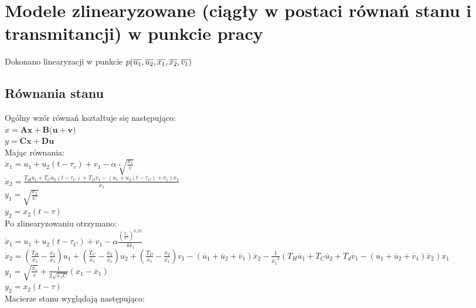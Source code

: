\section{Modele zlinearyzowane (ciągły w postaci równań stanu i transmitancji) w punkcie pracy}

Dokonano linearyzacji w punkcie $p(\overline{u_1}, \overline{u_2}, \overline{x_1}, \overline{x_2}, \overline{v_1})\\$





\subsection{Równania stanu}
Ogólny wzór równań kształtuje się następująco:\\
\(\dot{x}=\textbf{A}\textbf{x}+\textbf{B}(\textbf{u}+\textbf{v)}\)\\
\(\dot{y}=\textbf{C}\textbf{x}+\textbf{D}\textbf{u}\)\\
\newline Mając równania:\\
\(\dot{x}_1=u_1+u_2(t-\tau_c)+v_1-\alpha \sqrt[4]{\frac{x_1}{c}}\)\\
\(\dot{x}_2=\frac{T_H u_1+T_C u_2(t-\tau_C)+T_D v_1-(u_1+u_2(t-\tau_C)+v_1)x_2}{x_1}\)\\
\(y_1=\sqrt{\frac{x_1}{C}}\)\\
\(y_2=x_2(t-\tau)\)\\
\newline Po zlinearyzowaniu otrzymano:\\
 \(\dot{x}_1=u_1+u_2(t-\tau_C)+v_1-\alpha \frac{(\frac{\overline{x}_1}{C})^{0,25}}{4\overline{x}_1}\)\\
\(\dot{x}_2=(\frac{T_H}{\overline{x}_1}-\frac{\overline{x}_2}{\overline{x}_1})u_1+(\frac{T_C}{\overline{x}_1}-\frac{\overline{x}_2}{\overline{x}_1})u_2+(\frac{T_D}{\overline{x}_1}-\frac{\overline{x}_2}{\overline{x}_1})v_1-(\overline{u}_1+\overline{u}_2+\overline{v}_1)\overline{x}_2-\frac{1}{{\overline{x}_1}^2}(T_H\overline{u}_1+T_C\overline{u}_2+T_d\overline{v}_1-(\overline{u}_1+\overline{u}_2+\overline{v}_1)\overline{x}_2)x_1\)\\
\(y_1=\sqrt{\frac{\overline{x}_1}{c}}+\frac{1}{2\sqrt{\overline{x}_1 C}}(x_1-\overline{x}_1)\)\\
\(y_2=x_2(t-\tau)\)\\
\newline Macierze stanu wyglądają następująco:\\

